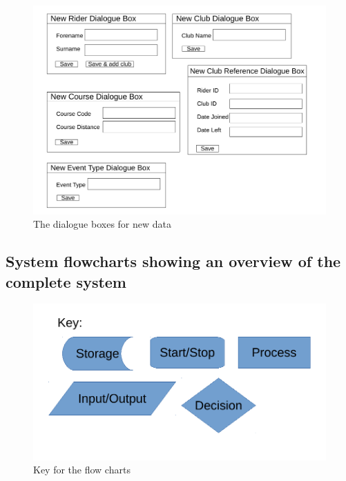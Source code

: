 \begin{figure}[H]
	\includegraphics[width=\textwidth]{./UIDesign/Dialogs.pdf}
	\caption{The dialogue boxes for new data} \label{fig:The dialogue boxes for new data} 	
\end{figure}

\subsection{System flowcharts showing an overview of the complete system}
\begin{figure}[H]
	\includegraphics[width=\textwidth]{./FlowChart/Key.pdf}
	\caption{Key for the flow charts} \label{fig:Key for the flow charts} 	
\end{figure}

